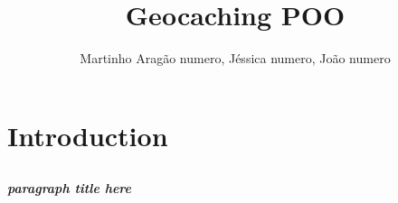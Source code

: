 \documentclass[a4paper,12pt]{report}
\author{Martinho Aragão numero, Jéssica numero, João numero}
\title{Geocaching POO}
\begin{document}
\maketitle
\tableofcontents

\chapter{Introduction}

\section{}
\subsection{}
\subsubsection{}

\paragraph{paragraph title here}
\end{document}
